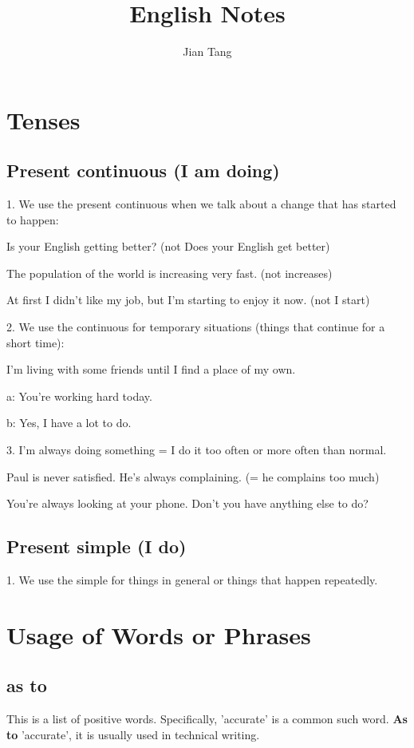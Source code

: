 \documentclass[12pt, letterpaper, onecolumn, final]{report}
\title{English Notes}
\author{Jian Tang}
\begin{document}
\maketitle
\tableofcontents

\chapter{Tenses}
\section{Present continuous (I am doing)}
1. We use the present continuous when we talk about a change that has started to happen:

Is your English getting better? (not Does your English get better)

The population of the world is increasing very fast. (not increases)

At first I didn’t like my job, but I’m starting to enjoy it now. (not I start)

2. We use the continuous for temporary situations (things that continue for a short time):

I’m living with some friends until I find a place of my own.

a: You’re working hard today.

b: Yes, I have a lot to do.

3. I’m always doing something = I do it too often or more often than normal.

Paul is never satisfied. He’s always complaining. (= he complains too much)

You’re always looking at your phone.  Don’t you have anything else to do? 

\section{Present simple (I do)}
1. We use the simple for things in general or things that happen repeatedly.

\chapter{Usage of Words or Phrases}
\section{as to}
This is a list of positive words. Specifically, 'accurate' is a common such word. \textbf{As to} 'accurate', it is usually used in technical writing.
\end{document}
